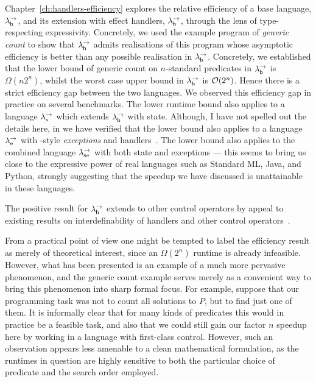 \documentclass[12pt,phd,lfcs,twoside,openright,logo,leftchapter,normalheadings]{infthesis}
\theoremstyle{plain}
\theoremstyle{definition}
\begin{document}
Chapter~\ref{ch:handlers-efficiency} explores the relative efficiency
of a base language, $\lambda^\rightarrow_{\mathsf{b}}$, and its extension with effect handlers,
$\lambda^\rightarrow_{\mathsf{h}}$, through the lens of type-respecting expressivity. Concretely,
we used the example program of \emph{generic count} to show that
$\lambda^\rightarrow_{\mathsf{h}}$ admits realisations of this program whose asymptotic
efficiency is better than any possible realisation in
$\lambda^\rightarrow_{\mathsf{b}}$. Concretely, we established that the lower bound of generic
count on $n$-standard predicates in $\lambda^\rightarrow_{\mathsf{b}}$ is $\Omega(n2^n)$, whilst
the worst case upper bound in $\lambda^\rightarrow_{\mathsf{h}}$ is $\mathcal{O}(2^n)$. Hence there is
a strict efficiency gap between the two languages. We observed this
efficiency gap in practice on several benchmarks.
%
The lower runtime bound also applies to a language $\lambda^\rightarrow_{\textrm{\normalfont s}}$ which
extends $\lambda^\rightarrow_{\mathsf{b}}$ with state.
%
Although, I have not spelled out the details here, in
\citet{HillerstromLL20} we have verified that the lower bound also
applies to a language $\lambda^\rightarrow_{\textrm{\normalfont e}}$ with \citeauthor{BentonK01}-style
\emph{exceptions} and handlers~\cite{BentonK01}.
%
The lower bound also applies to the combined language $\lambda^\rightarrow_{\textrm{\normalfont se}}$
with both state and exceptions --- this seems to bring us close to
the expressive power of real languages such as Standard ML, Java, and
Python, strongly suggesting that the speedup we have discussed is
unattainable in these languages.

The positive result for $\lambda^\rightarrow_{\mathsf{h}}$ extends to other control operators by
appeal to existing results on interdefinability of handlers and other
control operators~\cite{ForsterKLP19,PirogPS19}.
%
%

From a practical point of view one might be tempted to label the
efficiency result as merely of theoretical interest, since an
$\Omega(2^n)$ runtime is already infeasible.  However, what has been
presented is an example of a much more pervasive phenomenon, and the
generic count example serves merely as a convenient way to bring this
phenomenon into sharp formal focus. For example, suppose that our
programming task was not to count all solutions to $P$, but to find
just one of them.  It is informally clear that for many kinds of
predicates this would in practice be a feasible task, and also that we
could still gain our factor $n$ speedup here by working in a language
with first-class control.  However, such an observation appears less
amenable to a clean mathematical formulation, as the runtimes in
question are highly sensitive to both the particular choice of
predicate and the search order employed.
\end{document}
